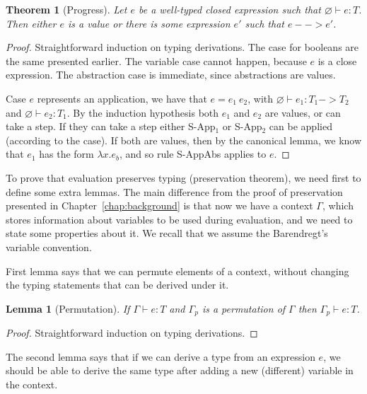 \documentclass[tese,capa,english]{texufpel}
\newtheorem{theorem}{Theorem}
\newtheorem{lemma}{Lemma}
\begin{document}
\begin{theorem}[Progress]
Let $e$ be a well-typed closed expression such that $\varnothing \vdash e : T$. Then either $e$ is a value or there is some expression $e'$ such that $e --> e'$.
\end{theorem}

\begin{proof}
  Straightforward induction on typing derivations. The case for booleans are the same presented earlier. The variable case cannot happen, because $e$ is a close expression. The abstraction case is immediate, since abstractions are values. \vspace{3pt}
  
Case $e$ represents an application, we have that $e = e_1 ~ e_2$, with $\varnothing \vdash e_1 : T_1 -> T_2$ and $\varnothing \vdash e_2 : T_1$. By the induction hypothesis both $e_1$ and $e_2$ are values, or can take a step. If they can take a step either {\footnotesize S-App$_1$} or {\footnotesize S-App$_2$} can be applied (according to the case). If both are values, then by the canonical lemma, we know that $e_1$ has the form $\lambda x . e_b$, and so rule {\footnotesize S-AppAbs} applies to $e$.
\end{proof}

To prove that evaluation preserves typing (preservation theorem), we need first to define some extra lemmas. The main difference from the proof of preservation presented in Chapter~\ref{chap:background} is that now we have a context $\Gamma$, which stores information about variables to be used during evaluation, and we need to state some properties about it. We recall that we assume the Barendregt's variable convention.

First lemma says that we can permute elements of a context, without changing the typing statements that can be derived under it.

\begin{lemma}[Permutation]
If $\Gamma \vdash e : T$ and $\Gamma_p$ is a permutation of $\Gamma$ then $\Gamma_p \vdash e : T$.
\end{lemma}

\begin{proof}
Straightforward induction on typing derivations.
\end{proof}

The second lemma says that if we can derive a type from an expression $e$, we should be able to derive the same type after adding a new (different) variable in the context.
\end{document}
